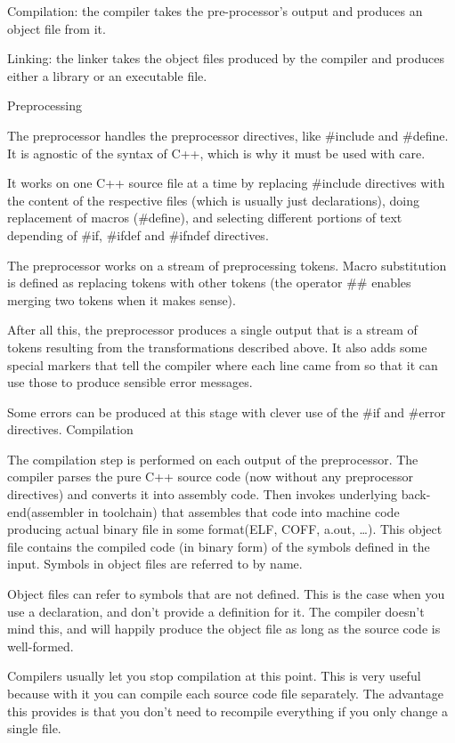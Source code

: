 \documentclass[11pt]{article}
\begin{document}
Compilation: the compiler takes the pre-processor's output and
produces an object file from it.

Linking: the linker takes the object files produced by the
compiler and produces either a library or an executable file.

Preprocessing

The preprocessor handles the preprocessor directives, like \#include
and \#define. It is agnostic of the syntax of C++, which is why it must
be used with care.

It works on one C++ source file at a time by replacing \#include
directives with the content of the respective files (which is usually
just declarations), doing replacement of macros (\#define), and
selecting different portions of text depending of \#if, \#ifdef and
\#ifndef directives.

The preprocessor works on a stream of preprocessing tokens. Macro
substitution is defined as replacing tokens with other tokens (the
operator \#\# enables merging two tokens when it makes sense).

After all this, the preprocessor produces a single output that is a
stream of tokens resulting from the transformations described
above. It also adds some special markers that tell the compiler where
each line came from so that it can use those to produce sensible error
messages.

Some errors can be produced at this stage with clever use of the \#if
and \#error directives.  Compilation

The compilation step is performed on each output of the
preprocessor. The compiler parses the pure C++ source code (now
without any preprocessor directives) and converts it into assembly
code. Then invokes underlying back-end(assembler in toolchain) that
assembles that code into machine code producing actual binary file in
some format(ELF, COFF, a.out, \ldots{}). This object file contains the
compiled code (in binary form) of the symbols defined in the
input. Symbols in object files are referred to by name.

Object files can refer to symbols that are not defined. This is the
case when you use a declaration, and don't provide a definition for
it. The compiler doesn't mind this, and will happily produce the
object file as long as the source code is well-formed.

Compilers usually let you stop compilation at this point. This is very
useful because with it you can compile each source code file
separately. The advantage this provides is that you don't need to
recompile everything if you only change a single file.
\end{document}
